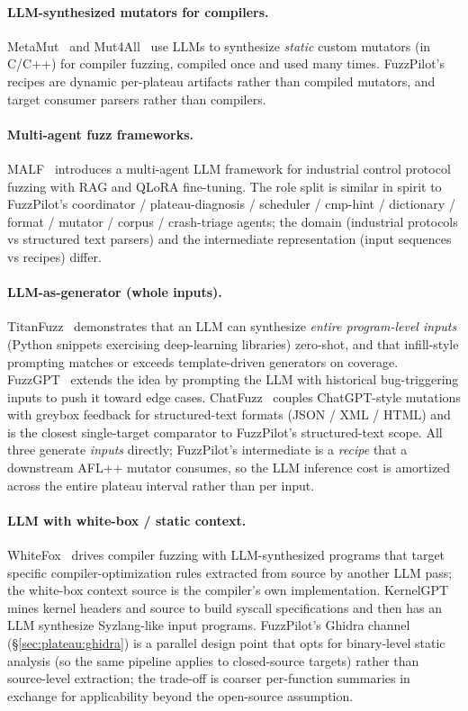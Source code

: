 \documentclass[11pt]{article}
\begin{document}
\paragraph{LLM-synthesized mutators for compilers.}
MetaMut~\cite{ou2024metamut} and Mut4All~\cite{ye2025mut4all} use
LLMs to synthesize \emph{static} custom mutators (in C/C++) for
compiler fuzzing, compiled once and used many times. FuzzPilot's
recipes are dynamic per-plateau artifacts rather than compiled
mutators, and target consumer parsers rather than compilers.

\paragraph{Multi-agent fuzz frameworks.}
MALF~\cite{malf2025} introduces a multi-agent LLM framework for
industrial control protocol fuzzing with RAG and QLoRA fine-tuning.
The role split is similar in spirit to FuzzPilot's coordinator /
plateau-diagnosis / scheduler / cmp-hint / dictionary / format /
mutator / corpus / crash-triage agents; the domain (industrial
protocols vs structured text parsers) and the intermediate
representation (input sequences vs recipes) differ.

\paragraph{LLM-as-generator (whole inputs).}
TitanFuzz~\cite{deng2023titanfuzz} demonstrates that an LLM can
synthesize \emph{entire program-level inputs} (Python snippets
exercising deep-learning libraries) zero-shot, and that
infill-style prompting matches or exceeds template-driven
generators on coverage. FuzzGPT~\cite{deng2024fuzzgpt} extends the
idea by prompting the LLM with historical bug-triggering inputs to
push it toward edge cases. ChatFuzz~\cite{hu2023chatfuzz} couples
ChatGPT-style mutations with greybox feedback for structured-text
formats (JSON / XML / HTML) and is the closest single-target
comparator to FuzzPilot's structured-text scope. All three
generate \emph{inputs} directly; FuzzPilot's intermediate is a
\emph{recipe} that a downstream AFL++ mutator consumes, so the LLM
inference cost is amortized across the entire plateau interval
rather than per input.

\paragraph{LLM with white-box / static context.}
WhiteFox~\cite{yang2024whitefox} drives compiler fuzzing with
LLM-synthesized programs that target specific compiler-optimization
rules extracted from source by another LLM pass; the white-box
context source is the compiler's own implementation. KernelGPT
~\cite{yang2024kernelgpt} mines kernel headers and source to build
syscall specifications and then has an LLM synthesize Syzlang-like
input programs. FuzzPilot's Ghidra channel
(\S\ref{sec:plateau:ghidra}) is a parallel design point that opts
for binary-level static analysis (so the same pipeline applies to
closed-source targets) rather than source-level extraction; the
trade-off is coarser per-function summaries in exchange for
applicability beyond the open-source assumption.
\end{document}
